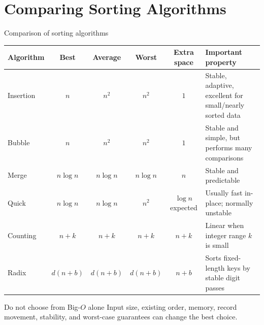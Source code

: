 \documentclass[aspectratio=169]{beamer}
\begin{document}
\section{Comparing Sorting Algorithms}

\begin{frame}{Comparison of sorting algorithms}
  \scriptsize
  \begin{center}
    \begin{tabular}{L{0.16\textwidth}ccccL{0.24\textwidth}}
      \toprule
      \textbf{Algorithm} & \textbf{Best} & \textbf{Average} & \textbf{Worst} &
      \textbf{Extra space} & \textbf{Important property} \\
      \midrule
      Insertion & $n$ & $n^2$ & $n^2$ & $1$ & Stable, adaptive, excellent for small/nearly sorted data \\
      Bubble & $n$ & $n^2$ & $n^2$ & $1$ & Stable and simple, but performs many comparisons \\
      Merge & $n\log n$ & $n\log n$ & $n\log n$ & $n$ & Stable and predictable \\
      Quick & $n\log n$ & $n\log n$ & $n^2$ & $\log n$ expected & Usually fast in-place; normally unstable \\
      Counting & $n+k$ & $n+k$ & $n+k$ & $n+k$ & Linear when integer range $k$ is small \\
      Radix & $d(n+b)$ & $d(n+b)$ & $d(n+b)$ & $n+b$ & Sorts fixed-length keys by stable digit passes \\
      \bottomrule
    \end{tabular}
  \end{center}
  \begin{alertblock}{Do not choose from Big-$O$ alone}
    Input size, existing order, memory, record movement, stability, and worst-case
    guarantees can change the best choice.
  \end{alertblock}
\end{frame}
\end{document}
